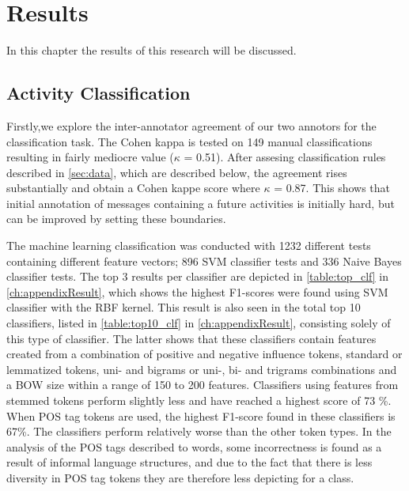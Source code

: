 
\chapter{Results} %

\label{ch:results} %

In this chapter the results of this research will be discussed. %


\iffalse
\section{Activity Classification}\label{sec:res_activity}
Firstly,we explore the inter-annotator agreement of our two annotors for the classification task. The Cohen kappa is tested on 149 manual classifications resulting in fairly mediocre value ($\kappa$ = 0.51). After assesing classification rules described in \autoref{sec:data}, which are described below, the agreement rises substantially and obtain a Cohen kappe score where $\kappa$ = 0.87. This shows that initial annotation of messages containing a future activities is initially hard, but can be improved by setting these boundaries.
 
The machine learning classification was conducted with 1232 different tests containing different feature vectors; 896 SVM classifier tests and 336 Naive Bayes classifier tests. The top 3 results per classifier are depicted in \autoref{table:top_clf} in \autoref{ch:appendixResult}, which shows the highest F1-scores were found using SVM classifier with the RBF kernel. This result is also seen in the total top 10 classifiers, listed in \autoref{table:top10_clf} in \autoref{ch:appendixResult}, consisting solely of this type of classifier. The latter shows that these classifiers contain features created from a combination of positive and negative influence tokens, standard or lemmatized tokens, uni- and bigrams or uni-, bi- and trigrams combinations and a BOW size within a range of 150 to 200 features. Classifiers using features from stemmed tokens perform slightly less and have reached a highest score of 73 \%. When POS tag tokens are used, the highest F1-score found in these classifiers is 67\%. The classifiers perform relatively worse than the other token types. In the analysis of the POS tags described to words, some incorrectness is found as a result of informal language structures, and due to the fact that there is less diversity in POS tag tokens they are therefore less depicting for a class. 

